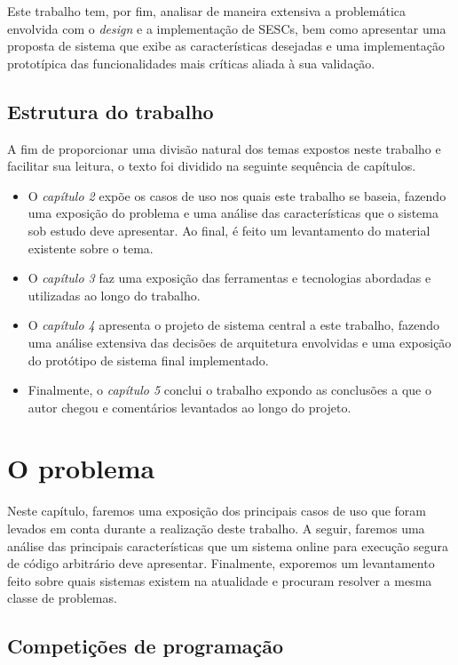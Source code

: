 \documentclass[ruledheader, 12pt]{abnt}
\begin{document}
Este trabalho tem, por fim, analisar de maneira extensiva a problemática envolvida com o \emph{design} e a implementação de SESCs, bem como apresentar uma proposta de sistema que exibe as características desejadas e uma implementação prototípica das funcionalidades mais críticas aliada à sua validação.

\section{Estrutura do trabalho}

A fim de proporcionar uma divisão natural dos temas expostos neste trabalho e facilitar sua leitura, o texto foi dividido na seguinte sequência de capítulos.
\begin{itemize}
	\item O \emph{capítulo 2} expõe os casos de uso nos quais este trabalho se baseia, fazendo uma exposição do problema e uma análise das características que o sistema sob estudo deve apresentar. Ao final, é feito um levantamento do material existente sobre o tema.
	\item O \emph{capítulo 3} faz uma exposição das ferramentas e tecnologias abordadas e utilizadas ao longo do trabalho.
	\item O \emph{capítulo 4} apresenta o projeto de sistema central a este trabalho, fazendo uma análise extensiva das decisões de arquitetura envolvidas e uma exposição do protótipo de sistema final implementado.
	\item Finalmente, o \emph{capítulo 5} conclui o trabalho expondo as conclusões a que o autor chegou e comentários levantados ao longo do projeto.
\end{itemize}

\chapter{O problema}

Neste capítulo, faremos uma exposição dos principais casos de uso que foram levados em conta durante a realização deste trabalho. A seguir, faremos uma análise das principais características que um sistema online para execução segura de código arbitrário deve apresentar. Finalmente, exporemos um levantamento feito sobre quais sistemas existem na atualidade e procuram resolver a mesma classe de problemas.

\section{Competições de programação}
\end{document}
